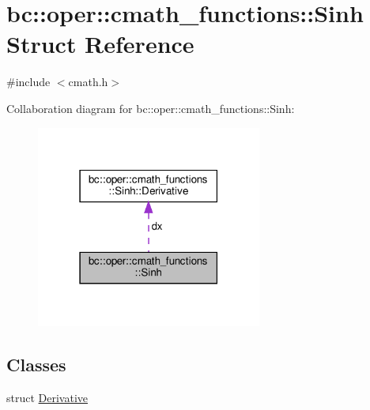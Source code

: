 \hypertarget{structbc_1_1oper_1_1cmath__functions_1_1Sinh}{}\section{bc\+:\+:oper\+:\+:cmath\+\_\+functions\+:\+:Sinh Struct Reference}
\label{structbc_1_1oper_1_1cmath__functions_1_1Sinh}


{\ttfamily \#include $<$cmath.\+h$>$}



Collaboration diagram for bc\+:\+:oper\+:\+:cmath\+\_\+functions\+:\+:Sinh\+:\nopagebreak
\begin{figure}[H]
\begin{center}
\leavevmode
\includegraphics[width=210pt]{structbc_1_1oper_1_1cmath__functions_1_1Sinh__coll__graph}
\end{center}
\end{figure}
\subsection*{Classes}
\begin{DoxyCompactItemize}
\item 
struct \hyperlink{structbc_1_1oper_1_1cmath__functions_1_1Sinh_1_1Derivative}{Derivative}
\end{DoxyCompactItemize}
